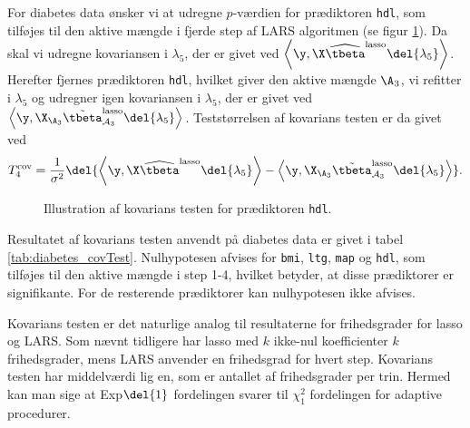 \begin{eks}
For diabetes data ønsker vi at udregne \(p\)-værdien for prædiktoren \texttt{hdl}, som tilføjes til den aktive mængde i fjerde step af LARS algoritmen (se figur \ref{fig:diabetes_covTest}). 
Da skal vi udregne kovariansen i \(\lambda_5\), der er givet ved \(\left\langle \y, \X \widehat{\tbeta}^\text{lasso} \del{\lambda_5} \right\rangle\).
Herefter fjernes prædiktoren \texttt{hdl}, hvilket giver den aktive mængde \(\A_{3}\), vi refitter i \(\lambda_5\) og udregner igen kovariansen i \(\lambda_5\), der er givet ved \(\left\langle  \y, \X_{\A_{3}} \tilde{\tbeta}^\text{lasso}_{\mathcal{A}_{3}} \del{\lambda_{5}} \right\rangle\).
Teststørrelsen af kovarians testen er da givet ved
\begin{align*}
T_4^\text{cov} = \frac{1}{\sigma^2} \del{ \left\langle \y, \X \widehat{\tbeta}^\text{lasso} \del{\lambda_{5}} \right\rangle - \left\langle  \y, \X_{\A_{3}} \tilde{\tbeta}^\text{lasso}_{\mathcal{A}_{3}} \del{\lambda_{5}} \right\rangle}.
\end{align*}
%
\begin{figure}[H]
\centering
{}
\caption{Illustration af kovarians testen for prædiktoren \texttt{hdl}.} \label{fig:diabetes_covTest}
\end{figure}
%
Resultatet af kovarians testen anvendt på diabetes data er givet i tabel \ref{tab:diabetes_covTest}.
Nulhypotesen afvises for \texttt{bmi}, \texttt{ltg}, \texttt{map} og \texttt{hdl}, som tilføjes til den aktive mængde i step 1-4, hvilket betyder, at disse prædiktorer er signifikante.
For de resterende prædiktorer kan nulhypotesen ikke afvises.
%

\end{eks}

Kovarians testen er det naturlige analog til resultaterne for frihedsgrader for lasso og LARS.
Som nævnt tidligere har lasso med \(k\) ikke-nul koefficienter \(k\) frihedsgrader, mens LARS anvender en frihedsgrad for hvert step.
Kovarians testen har middelværdi lig en, som er antallet af frihedsgrader per trin.
Hermed kan man sige at Exp\(\del{1}\) fordelingen svarer til \(\chi_1^2\) fordelingen for adaptive procedurer.

